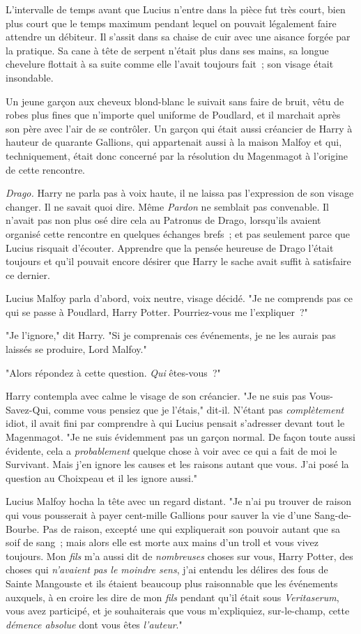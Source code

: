 L'intervalle de temps avant que Lucius n'entre dans la pièce fut très court, bien plus court que le temps maximum pendant lequel on pouvait légalement faire attendre un débiteur. Il s'assit dans sa chaise de cuir avec une aisance forgée par la pratique. Sa cane à tête de serpent n'était plus dans ses mains, sa longue chevelure flottait à sa suite comme elle l'avait toujours fait~; son visage était insondable.

Un jeune garçon aux cheveux blond-blanc le suivait sans faire de bruit, vêtu de robes plus fines que n'importe quel uniforme de Poudlard, et il marchait après son père avec l'air de se contrôler. Un garçon qui était aussi créancier de Harry à hauteur de quarante Gallions, qui appartenait aussi à la maison Malfoy et qui, techniquement, était donc concerné par la résolution du Magenmagot à l'origine de cette rencontre.

\emph{Drago.} Harry ne parla pas à voix haute, il ne laissa pas l'expression de son visage changer. Il ne savait quoi dire. Même \emph{Pardon} ne semblait pas convenable. Il n'avait pas non plus osé dire cela au Patronus de Drago, lorsqu'ils avaient organisé cette rencontre en quelques échanges brefs~; et pas seulement parce que Lucius risquait d'écouter. Apprendre que la pensée heureuse de Drago l'était toujours et qu'il pouvait encore désirer que Harry le sache avait suffit à satisfaire ce dernier.

Lucius Malfoy parla d'abord, voix neutre, visage décidé. "Je ne comprends pas ce qui se passe à Poudlard, Harry Potter. Pourriez-vous me l'expliquer~?"

"Je l'ignore," dit Harry. "Si je comprenais ces événements, je ne les aurais pas laissés se produire, Lord Malfoy."

"Alors répondez à cette question. \emph{Qui} êtes-vous~?"

Harry contempla avec calme le visage de son créancier. "Je ne suis pas Vous-Savez-Qui, comme vous pensiez que je l'étais," dit-il. N'étant pas \emph{complètement} idiot, il avait fini par comprendre à qui Lucius pensait s'adresser devant tout le Magenmagot. "Je ne suis évidemment pas un garçon normal. De façon toute aussi évidente, cela a \emph{probablement} quelque chose à voir avec ce qui a fait de moi le Survivant. Mais j'en ignore les causes et les raisons autant que vous. J'ai posé la question au Choixpeau et il les ignore aussi."

Lucius Malfoy hocha la tête avec un regard distant. "Je n'ai pu trouver de raison qui vous pousserait à payer cent-mille Gallions pour sauver la vie d'une Sang-de-Bourbe. Pas de raison, excepté une qui expliquerait son pouvoir autant que sa soif de sang~; mais alors elle est morte aux mains d'un troll et vous vivez toujours. Mon \emph{fils} m'a aussi dit de \emph{nombreuses} choses sur vous, Harry Potter, des choses qui \emph{n'avaient pas le moindre sens}, j'ai entendu les délires des fous de Sainte Mangouste et ils étaient beaucoup plus raisonnable que les événements auxquels, à en croire les dire de mon \emph{fils} pendant qu'il était sous \emph{Veritaserum}, vous avez participé, et je souhaiterais que vous m'expliquiez, sur-le-champ, cette \emph{démence absolue} dont vous êtes \emph{l'auteur}."

